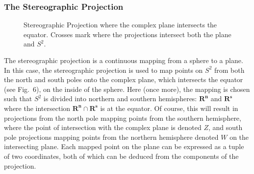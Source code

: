 \documentclass[fleqn, twocolumn, 10pt]{article}
\begin{document}

\subsubsection{The Stereographic Projection}


\begin{figure}[t]
\centering
{}
\caption{Stereographic Projection where the complex plane intersects the equator. Crosses mark where the projections intersect both the plane and $S^2$.}
\end{figure}

The stereographic projection is a continuous mapping from a sphere to a plane. In this case, the stereographic projection is used to map points on $S^2$ from both the north and south poles onto the complex plane, which intersects the equator (see Fig.~6), on the inside of the sphere. Here (once more), the mapping is chosen such that $S^2$ is divided into northern and southern hemispheres: $\mathbf{R^n}$ and $\mathbf{R^s}$ where the intersection $\mathbf{R^n}\cap \mathbf{R^s}$ is at the equator. Of course, this will result in projections from the north pole mapping points from the southern hemisphere, where the point of intersection with the complex plane is denoted $Z$, and south pole projections mapping points from the northern hemisphere denoted $W$ on the intersecting plane. Each mapped point on the plane can be expressed as a tuple of two coordinates, both of which can be deduced from the components of the projection.
\end{document}
